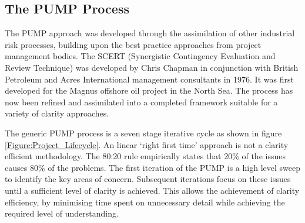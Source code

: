 \subsection{The PUMP Process}

The PUMP approach was developed through the assimilation of other industrial risk processes, building upon the best practice approaches from project management bodies.
The SCERT (Synergistic Contingency Evaluation and Review Technique) was developed by Chris Chapman in conjunction with British Petroleum and Acres International management consultants in 1976.
It was first developed for the Magnus offshore oil project in the North Sea. 
The process has now been refined and assimilated into a completed framework suitable for a variety of clarity approaches.

The generic PUMP process is a seven stage iterative cycle as shown in figure \ref{Figure:Project_Lifecycle}. 
An linear `right first time' approach is not a clarity efficient methodology.
The 80:20 rule empirically states that 20\% of the issues causes 80\% of the problems. 
The first iteration of the PUMP is a high level sweep to identify the key areas of concern.
Subsequent iterations focus on these issues until a sufficient level of clarity is achieved.
This allows the achievement of clarity efficiency, by minimising time spent on unnecessary detail while achieving the required level of understanding.

